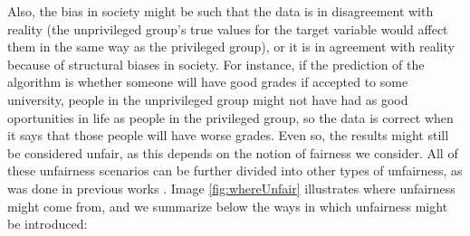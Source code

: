 \documentclass[conference]{IEEEtran}
\begin{document}
Also, the bias in society might be such that the data is in disagreement with reality (the unprivileged group's true values for the target variable would affect them in the same way as the privileged group), or it is in agreement with reality because of structural biases in society. For instance, if the prediction of the algorithm is whether someone will have good grades if accepted to some university, people in the unprivileged group might not have had as good oportunities in life as people in the privileged group, so the data is correct when it says that those people will have worse grades. Even so, the results might still be considered unfair, as this depends on the notion of fairness we consider. All of these unfairness scenarios can be further divided into other types of unfairness, as was done in previous works \cite{mehrabi2021survey}. Image \ref{fig:whereUnfair} illustrates where unfairness might come from, and we summarize below the ways in which unfairness might be introduced:
\end{document}
